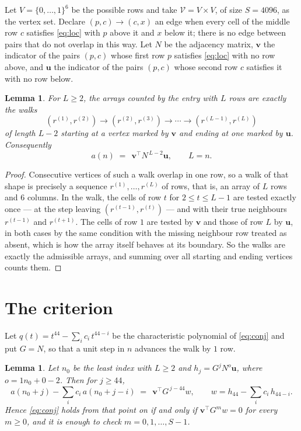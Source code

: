 \documentclass[11pt,a4paper]{article}
\theoremstyle{plain}
\newtheorem{lemma}[theorem]{Lemma}
\theoremstyle{definition}
\begin{document}
Let $V=\{0,\dots,1\}^{6}$ be the possible rows and take
$\mathcal V=V\times V$, of size $S=4096$, as the vertex set. Declare $(p,c)\to(c,x)$ an edge
when every cell of the middle row $c$ satisfies \eqref{eq:loc} with $p$ above it and $x$
below it; there is no edge between pairs that do not overlap in this way. Let $N$ be the
adjacency matrix, $\mathbf{v}$ the indicator of the pairs $(p,c)$ whose first row $p$
satisfies \eqref{eq:loc} with no row above, and $\mathbf{u}$ the indicator of
the pairs $(p,c)$ whose second row $c$ satisfies it with no row below.

\begin{lemma}\label{lem:walk}
For $L\ge2$, the arrays counted by the entry with $L$ rows are exactly the walks
\[
(r^{(1)},r^{(2)})\to(r^{(2)},r^{(3)})\to\cdots\to(r^{(L-1)},r^{(L)})
\]
of length $L-2$ starting at a vertex marked by $\mathbf{v}$ and ending at one marked by
$\mathbf{u}$. Consequently
\[
a(n)\;=\;\,\mathbf{v}^{\!\top}N^{\,L-2}\mathbf{u},\qquad L=n .
\]
\end{lemma}

\begin{proof}
Consecutive vertices of such a walk overlap in one row, so a walk of that shape is
precisely a sequence $r^{(1)},\dots,r^{(L)}$ of rows, that is, an array of $L$ rows
and $6$ columns. In the walk, the cells of row $t$ for $2\le t\le L-1$ are tested
exactly once --- at the step leaving $(r^{(t-1)},r^{(t)})$ --- and with their true
neighbours $r^{(t-1)}$ and $r^{(t+1)}$. The cells of row $1$ are tested by
$\mathbf{v}$ and those of row $L$ by $\mathbf{u}$, in both cases by the same condition
with the missing neighbour row treated as absent, which is how the array itself behaves at
its boundary. So the walks are exactly the admissible arrays, and summing over all starting
and ending vertices counts them.
\end{proof}

\section{The criterion}

Let $q(t)=t^{44}-\sum_i c_i\,t^{44-i}$ be the characteristic polynomial of
\eqref{eq:conj} and put $G=N$, so that a unit step in $n$ advances the walk by
$1$ row.

\begin{lemma}\label{lem:crit}
Let $n_0$ be the least index with $L\ge2$ and $h_j=G^{j}N^{o}\mathbf{u}$, where
$o=1n_0+0-2$. Then for $j\ge44$,
\[
a(n_0+j)-\sum_i c_i\,a(n_0+j-i)\;=\;\,\mathbf{v}^{\!\top}G^{\,j-44}w,
\qquad w=h_{44}-\sum_i c_i\,h_{44-i} .
\]
Hence \eqref{eq:conj} holds from that point on if and only if
$\mathbf{v}^{\!\top}G^{m}w=0$ for every $m\ge0$, and it is enough to check
$m=0,1,\dots,S-1$.
\end{lemma}
\end{document}
